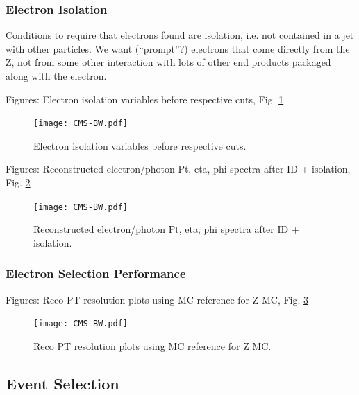 \subsubsection{Electron Isolation}
Conditions to require that electrons found are isolation, i.e. not contained in a jet with other particles.  
We want (``prompt''?) electrons that come directly from the Z, not from some other interaction with lots of other end products packaged along with the electron.  

Figures: Electron isolation variables before respective cuts, Fig. \ref{fig:ElecIsoVars}

 \begin{figure}[htb]
  \begin{center}
    \texttt{[image: CMS-BW.pdf]}
  \end{center}
  \caption[Electron isolation variables before respective cuts]{Electron isolation variables before respective cuts.}
  \label{fig:ElecIsoVars}
 \end{figure}



Figures: Reconstructed electron/photon Pt, eta, phi spectra after ID + isolation, Fig. \ref{fig:RecoSpectraAfterEidEiso}

 \begin{figure}[htb]
  \begin{center}
    \texttt{[image: CMS-BW.pdf]}
  \end{center}
  \caption[Reconstructed electron/photon Pt, eta, phi spectra after ID + isolation]{Reconstructed electron/photon Pt, eta, phi spectra after ID + isolation.}
  \label{fig:RecoSpectraAfterEidEiso}
 \end{figure}


\subsubsection{Electron Selection Performance} %
Figures: Reco PT resolution plots using MC reference for Z MC, Fig. \ref{fig:RecoPtResolution}

 \begin{figure}[htb]
  \begin{center}
    \texttt{[image: CMS-BW.pdf]}
  \end{center}
  \caption[Reco PT resolution plots using MC reference for Z MC]{Reco PT resolution plots using MC reference for Z MC.}
  \label{fig:RecoPtResolution}
 \end{figure}


\subsection{\Zee Event Selection}
